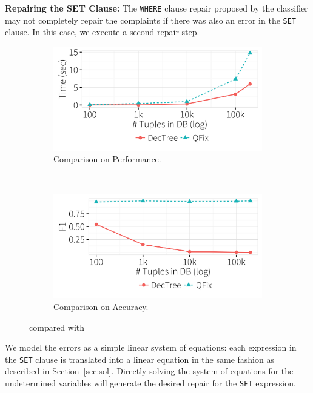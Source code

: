 \noindent
\textbf{Repairing the SET Clause:}
The \texttt{WHERE} clause repair proposed by the classifier may not completely repair 
the complaints if there was also an error in the \texttt{SET} clause. 
In this case, we execute a second repair step.
\begin{figure}[htb]
\centering
  \begin{subfigure} [t]{.75\columnwidth}
  \includegraphics[width = \columnwidth]{figures/heuristictime}
  \caption{Comparison on Performance.}
  \label{f:heuristic_time} 
  \end{subfigure}\\

  \begin{subfigure} [t]{.75\columnwidth}
  \includegraphics[width = \columnwidth]{figures/heuristicacc}
  \caption{Comparison on Accuracy.}
  \label{f:heuristic_acc} 
  \end{subfigure}
 \caption{\dt compared with \sys}
 \label{f:heuristic}
\end{figure}

We model the errors as a simple linear system of equations: 
each expression in the \texttt{SET} clause is translated into a
linear equation in the same fashion as described in Section~\ref{sec:sol}.
Directly solving the system of equations for the undetermined variables 
will generate the desired repair for the \texttt{SET} expression.



